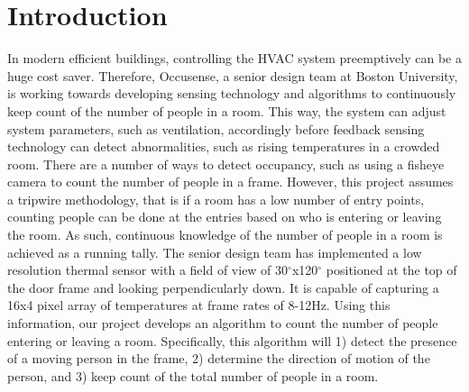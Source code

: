 \documentclass[12pt,oneside]{article} %
\begin{document}
\buecereportheaders

\setcounter{page}{1}

\section{Introduction}  %
In modern efficient buildings, controlling the HVAC system preemptively can be a huge cost saver. Therefore, Occusense, a senior design team at Boston University, is working towards developing sensing technology and algorithms to continuously keep count of the number of people in a room. This way, the system can adjust system parameters, such as ventilation, accordingly before feedback sensing technology can detect abnormalities, such as rising temperatures in a crowded room. There are a number of ways to detect occupancy, such as using a fisheye camera to count the number of people in a frame. However, this project assumes a tripwire methodology, that is if a room has a low number of entry points, counting people can be done at the entries based on who is entering or leaving the room. As such, continuous knowledge of the number of people in a room is achieved as a running tally. The senior design team has implemented a low resolution thermal sensor with a field of view of 30$^\circ$x120$^\circ$ positioned at the top of the door frame and looking perpendicularly down. It is capable of capturing a 16x4 pixel array of temperatures at frame rates of 8-12Hz. Using this information, our project develops an algorithm to count the number of people entering or leaving a room. Specifically, this algorithm will 1) detect the presence of a moving person in the frame, 2) determine the direction of motion of the person, and 3) keep count of the total number of people in a room.

\end{document}
